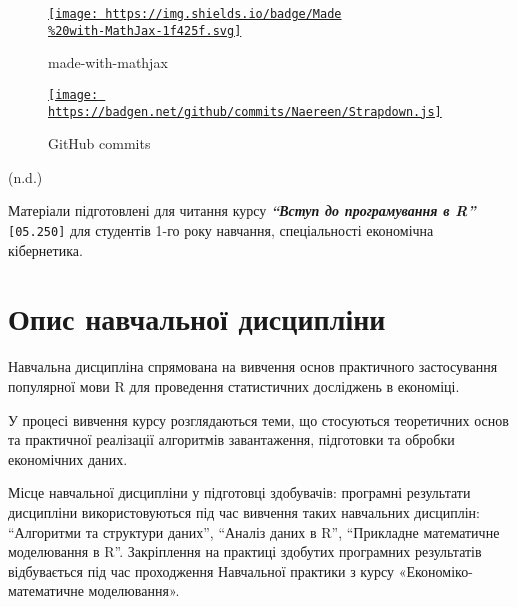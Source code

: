 \documentclass[
  letterpaper,
  DIV=11,
  numbers=noendperiod]{scrreprt}
\begin{document}
\begin{figure}

{\centering 

\href{https://www.mathjax.org/}{\texttt{[image: https://img.shields.io/badge/Made\\\%20with-MathJax-1f425f.svg]}}

}

\caption{made-with-mathjax}

\end{figure}

\begin{figure}

{\centering 

\href{https://GitHub.com/Naereen/StrapDown.js/commit/}{\texttt{[image: https://badgen.net/github/commits/Naereen/Strapdown.js]}}

}

\caption{GitHub commits}

\end{figure}

(n.d.)

Матеріали підготовлені для читання курсу \textbf{\emph{``Вступ до
програмування в R''}} \texttt{{[}05.250{]}} для студентів 1-го року
навчання, спеціальності економічна кібернетика.

\hypertarget{ux43eux43fux438ux441-ux43dux430ux432ux447ux430ux43bux44cux43dux43eux457-ux434ux438ux441ux446ux438ux43fux43bux456ux43dux438}{%
\section*{Опис навчальної
дисципліни}\label{ux43eux43fux438ux441-ux43dux430ux432ux447ux430ux43bux44cux43dux43eux457-ux434ux438ux441ux446ux438ux43fux43bux456ux43dux438}}

Навчальна дисципліна спрямована на вивчення основ практичного
застосування популярної мови R для проведення статистичних досліджень в
економіці.

У процесі вивчення курсу розглядаються теми, що стосуються теоретичних
основ та практичної реалізації алгоритмів завантаження, підготовки та
обробки економічних даних.

Місце навчальної дисципліни у підготовці здобувачів: програмні
результати дисципліни використовуються під час вивчення таких навчальних
дисциплін: ``Алгоритми та структури даних'', ``Аналіз даних в R'',
``Прикладне математичне моделювання в R''. Закріплення на практиці
здобутих програмних результатів відбувається під час проходження
Навчальної практики з курсу «Економіко-математичне моделювання».
\end{document}
